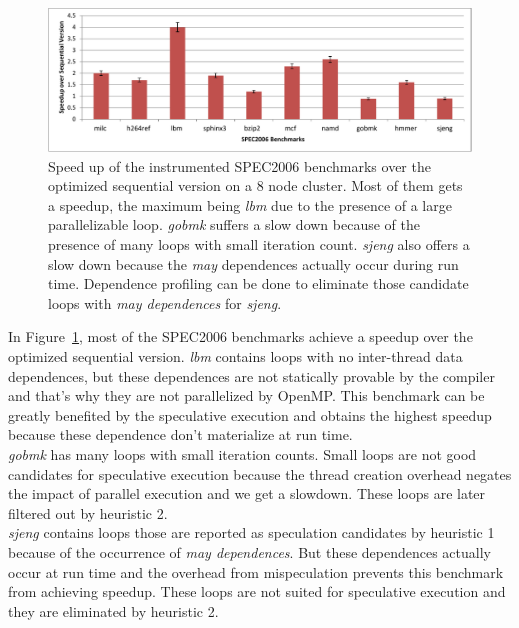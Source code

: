 \documentclass[10pt]{report}          %
\begin{document}
\begin{figure}
\begin{center}
\includegraphics[scale =0.75]{./pdf/speedup_spec2006.pdf}
\caption{Speed up of the instrumented SPEC2006 benchmarks over the optimized sequential version on a 8 node cluster. Most of them gets a speedup, the maximum being \textit{lbm} due to the presence of a large parallelizable loop. \textit{gobmk} suffers a slow down because of the presence of many loops with small iteration count. \textit{sjeng} also offers a slow down because the \textit{may} dependences actually occur during run time. Dependence profiling can be done to eliminate those candidate loops with \textit{may dependences} for \textit{sjeng}.}
\end{center}
\label{fig:speedup_spec2006}
\end{figure}

In Figure~\ref{fig:speedup_spec2006}, most of the SPEC2006 benchmarks achieve a speedup over the optimized sequential version.  \textit{lbm} contains loops with no inter-thread data
dependences, but these dependences are not statically provable by the compiler and that's why they are not parallelized by OpenMP. This benchmark can be greatly benefited by the speculative execution and obtains the highest speedup because these dependence don't materialize at run time.\\

\textit{gobmk} has many loops with small iteration counts. Small loops are not good candidates for speculative execution because the thread creation overhead negates the impact of parallel execution and we get a slowdown. These loops are later filtered out by heuristic 2.\\

\textit{sjeng} contains loops those are reported as speculation candidates by heuristic 1 because of the occurrence of \textit{may dependences}.  But these dependences actually occur at run time and the overhead from mispeculation prevents this benchmark from achieving speedup.  These loops are not suited for speculative execution and they are eliminated by heuristic 2.\\
\end{document}
